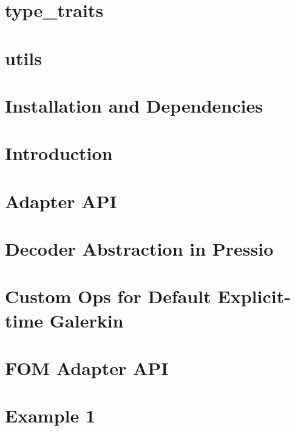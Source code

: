 \let\mypdfximage\pdfximage\def\pdfximage{\immediate\mypdfximage}\documentclass[twoside]{book}
\newcommand{\+}{\discretionary{\mbox{\scriptsize$\hookleftarrow$}}{}{}}
\begin{document}
\chapter{type\+\_\+traits}
\label{md_pages_components_type_traits}

\chapter{utils}
\label{md_pages_components_utils}

\chapter{Installation and Dependencies}
\label{md_pages_installation}

\chapter{Introduction}
\label{md_pages_introduction}

\chapter{Adapter API}
\label{md_pages_old_coreconcepts_adapter_api}

\chapter{Decoder Abstraction in Pressio}
\label{md_pages_old_coreconcepts_decoder}

\chapter{Custom Ops for Default Explicit-\/time Galerkin}
\label{md_pages_old_custom_ops_default_gal_exp}

\chapter{FOM Adapter API}
\label{md_pages_old_custom_ops}

\chapter{Example 1}
\label{md_pages_old_examples_example1}

\end{document}
